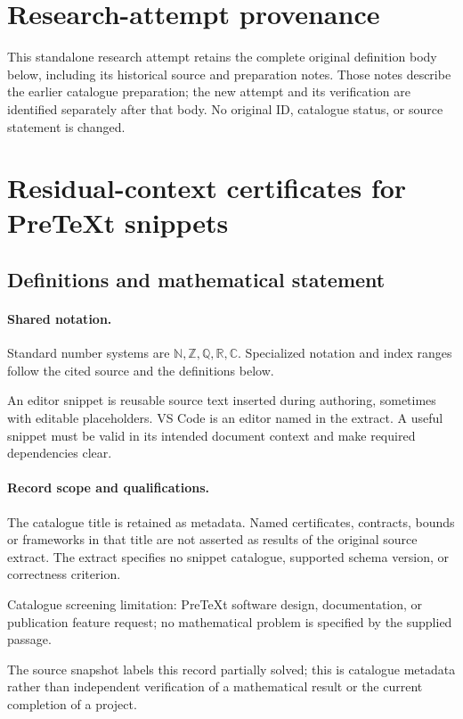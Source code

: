 \documentclass[11pt]{article}
\begin{document}
\section*{Research-attempt provenance}
This standalone research attempt retains the complete original definition body below,
including its historical source and preparation notes. Those notes describe the
earlier catalogue preparation; the new attempt and its verification are identified
separately after that body. No original ID, catalogue status, or source statement is changed.

\section{Residual-context certificates for PreTeXt snippets}\label{statement}

\subsection{Definitions and mathematical statement}

\paragraph{Shared notation.}Standard number systems are $\mathbb N,\mathbb Z,\mathbb Q,\mathbb R,\mathbb C$. Specialized notation and index ranges follow the cited source and the definitions below.


An editor snippet is reusable source text inserted during authoring, sometimes with editable placeholders. VS Code is an editor named in the extract. A useful snippet must be valid in its intended document context and make required dependencies clear.
\paragraph{Record scope and qualifications.}
The catalogue title is retained as metadata. Named certificates, contracts, bounds or frameworks in that title are not asserted as results of the original source extract.
The extract specifies no snippet catalogue, supported schema version, or correctness criterion.

Catalogue screening limitation: PreTeXt software design, documentation, or publication feature request; no mathematical problem is specified by the supplied passage.

The source snapshot labels this record partially solved; this is catalogue metadata rather than independent verification of a mathematical result or the current completion of a project.
\end{document}
